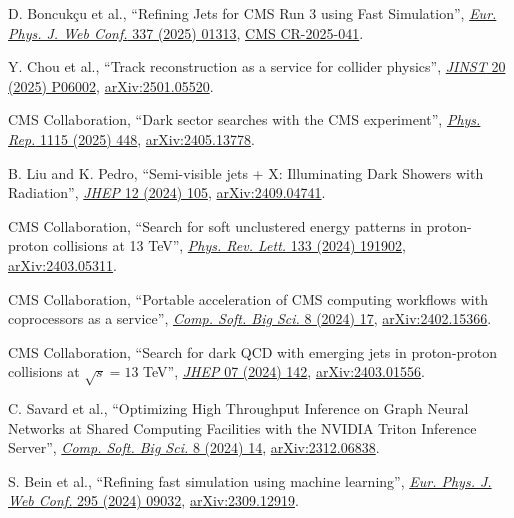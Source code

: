\begin{nbdescription}[leftmargin=12pt,font=\normalfont,labelsep=0em]
\item D. Boncuk\c{c}u et al., ``Refining Jets for CMS Run 3 using Fast Simulation'', \href{https://doi.org/10.1051/epjconf/202533701313}{\emph{Eur. Phys. J. Web Conf.} 337 (2025) 01313}, \href{https://cds.cern.ch/record/2926460}{CMS CR-2025-041}. %
\item Y. Chou et al., ``Track reconstruction as a service for collider physics'', \href{https://doi.org/10.1088/1748-0221/20/06/P06002}{\emph{JINST} 20 (2025) P06002}, \href{https://arxiv.org/abs/2501.05520}{arXiv:2501.05520}. %
\item CMS Collaboration, ``Dark sector searches with the CMS experiment'', \href{https://doi.org/10.1016/j.physrep.2024.09.013}{\emph{Phys. Rep.} 1115 (2025) 448}, \href{https://arxiv.org/abs/2405.13778}{arXiv:2405.13778}. %
\item \begin{sloppypar}B. Liu and K. Pedro, ``Semi-visible jets + X: Illuminating Dark Showers with Radiation'', \href{https://doi.org/10.1007/JHEP12(2024)105}{\emph{JHEP} 12 (2024) 105}, \href{https://arxiv.org/abs/2409.04741}{arXiv:2409.04741}.\end{sloppypar} %
\item CMS Collaboration, ``Search for soft unclustered energy patterns in proton-proton collisions at 13 TeV'', \href{http://dx.doi.org/10.1103/PhysRevLett.133.191902}{\emph{Phys. Rev. Lett.} 133 (2024) 191902}, \href{https://arxiv.org/abs/2403.05311}{arXiv:2403.05311}. %
\item CMS Collaboration, ``Portable acceleration of CMS computing workflows with coprocessors as a service'', \href{https://doi.org/10.1007/s41781-024-00124-1}{\emph{Comp. Soft. Big Sci.} 8 (2024) 17}, \href{https://arxiv.org/abs/2402.15366}{arXiv:2402.15366}. %
\item CMS Collaboration, ``Search for dark QCD with emerging jets in proton-proton collisions at $\sqrt{s} = 13$ TeV'', \href{https://doi.org/10.1007/JHEP07(2024)142}{\emph{JHEP} 07 (2024) 142}, \href{https://arxiv.org/abs/2403.01556}{arXiv:2403.01556}. %
\item C. Savard et al., ``Optimizing High Throughput Inference on Graph Neural Networks at Shared Computing Facilities with the NVIDIA Triton Inference Server'', \href{http://doi.org/10.1007/s41781-024-00123-2}{\emph{Comp. Soft. Big Sci.} 8 (2024) 14}, \href{https://arxiv.org/abs/2312.06838}{arXiv:2312.06838}. %
\item \begin{sloppypar}S. Bein et al., ``Refining fast simulation using machine learning'', \href{https://doi.org/10.1051/epjconf/202429509032}{\emph{Eur. Phys. J. Web Conf.} 295 (2024) 09032}, \href{https://arxiv.org/abs/2309.12919}{arXiv:2309.12919}.\end{sloppypar} %

\end{nbdescription}
